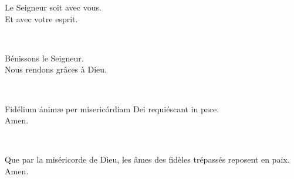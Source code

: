 \documentclass[twoside]{article}
\begin{document}
\begin{paracol}[1]{2}
\vv Le Seigneur soit avec vous. \\
\rr Et avec votre esprit.

~~

\vv Bénissons le Seigneur. \\
\rr Nous rendons grâces à Dieu.

\switchcolumn*

~~

\vv Fidélium ánimæ per misericórdiam Dei requiéscant in pace. \\
\rr Amen.

\switchcolumn

~~

\vv Que par la miséricorde de Dieu, les âmes des fidèles trépassés reposent en paix. \\
\rr Amen.

\end{paracol}
\end{document}
